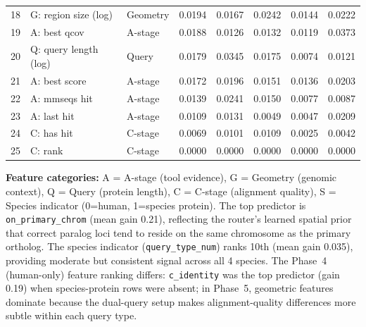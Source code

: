 \begin{table}[t]
\begin{tabular}{rllrrrrr}
18 & G: region size (log) & Geometry & 0.0194 & 0.0167 & 0.0242 & 0.0144 & 0.0222 \\
19 & A: best qcov & A-stage & 0.0188 & 0.0126 & 0.0132 & 0.0119 & 0.0373 \\
20 & Q: query length (log) & Query & 0.0179 & 0.0345 & 0.0175 & 0.0074 & 0.0121 \\
21 & A: best score & A-stage & 0.0172 & 0.0196 & 0.0151 & 0.0136 & 0.0203 \\
22 & A: mmseqs hit & A-stage & 0.0139 & 0.0241 & 0.0150 & 0.0077 & 0.0087 \\
23 & A: last hit & A-stage & 0.0109 & 0.0131 & 0.0049 & 0.0047 & 0.0209 \\
24 & C: has hit & C-stage & 0.0069 & 0.0101 & 0.0109 & 0.0025 & 0.0042 \\
25 & C: rank & C-stage & 0.0000 & 0.0000 & 0.0000 & 0.0000 & 0.0000 \\
\bottomrule
\end{tabular}

\vspace{3pt}
\footnotesize
\textbf{Feature categories:} A = A-stage (tool evidence), G = Geometry (genomic context), Q = Query (protein length), C = C-stage (alignment quality), S = Species indicator (0=human, 1=species protein). The top predictor is \texttt{on\_primary\_chrom} (mean gain 0.21), reflecting the router's learned spatial prior that correct paralog loci tend to reside on the same chromosome as the primary ortholog. The species indicator (\texttt{query\_type\_num}) ranks 10th (mean gain 0.035), providing moderate but consistent signal across all 4 species. The Phase~4 (human-only) feature ranking differs: \texttt{c\_identity} was the top predictor (gain 0.19) when species-protein rows were absent; in Phase~5, geometric features dominate because the dual-query setup makes alignment-quality differences more subtle within each query type.
\end{table}

